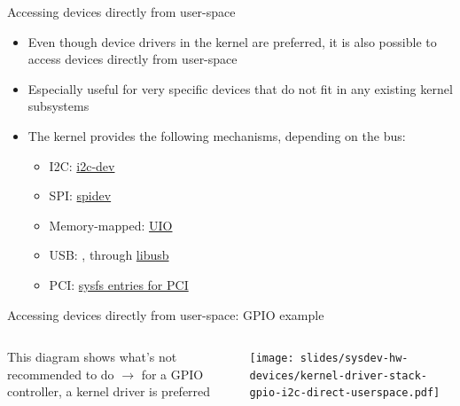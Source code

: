 \begin{frame}{Accessing devices directly from user-space}
  \begin{itemize}
  \item Even though device drivers in the kernel are preferred, it is
    also possible to access devices directly from user-space
  \item Especially useful for very specific devices that do not fit in
    any existing kernel subsystems
  \item The kernel provides the following mechanisms, depending on the
    bus:
    \begin{itemize}
    \item I2C: \href{https://docs.kernel.org/i2c/dev-interface.html}{i2c-dev}
    \item SPI: \href{https://docs.kernel.org/spi/spidev.html}{spidev}
    \item Memory-mapped: \href{https://docs.kernel.org/driver-api/uio-howto.html}{UIO}
    \item USB: , through \href{https://libusb.info/}{libusb}
    \item PCI: \href{https://docs.kernel.org/PCI/sysfs-pci.html}{sysfs entries for PCI}
    \end{itemize}
  \end{itemize}
\end{frame}

\begin{frame}{Accessing devices directly from user-space: GPIO example}
  \begin{columns}
     {\small This diagram shows what's not
      recommended to do $\rightarrow$ for a GPIO controller, a kernel driver
      is preferred}
    \begin{center}
      \texttt{[image: slides/sysdev-hw-devices/kernel-driver-stack-gpio-i2c-direct-userspace.pdf]}\\
    \end{center}
  \end{columns}
\end{frame}

